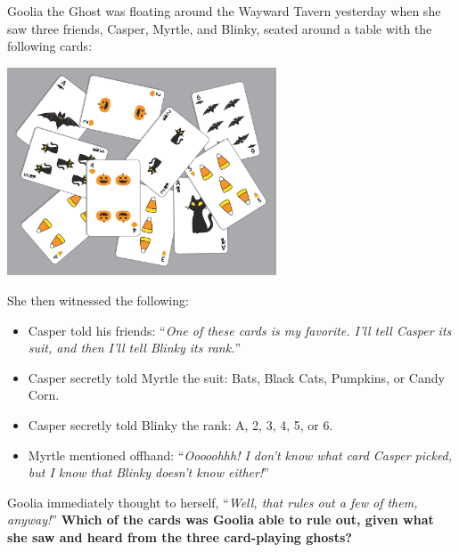 

Goolia the Ghost was floating around the Wayward Tavern yesterday when she
saw three friends, Casper, Myrtle, and Blinky, seated around a table with the
following cards:

\begin{center}
    \includegraphics[width=0.6\textwidth]{assets/kat/cardstogeth}
\end{center}

She then witnessed the following:

\begin{itemize}
  \item Casper told his friends:
        ``\textit{One of these cards is my favorite. I'll tell Casper
        its suit, and then I'll tell Blinky its rank.}''
  \item Casper secretly told Myrtle the suit:
        Bats, Black Cats, Pumpkins, or Candy Corn.
  \item Casper secretly told Blinky the rank:
        A, 2, 3, 4, 5, or 6.
  \item Myrtle mentioned offhand:
        ``\textit{Ooooohhh! I don't know what card Casper picked, but I know
        that Blinky doesn't know either!}''
\end{itemize}

Goolia immediately thought to herself,
``\textit{Well, that rules out a few of them, anyway!}''
\textbf{Which of the cards was Goolia able to rule out, given what
she saw and heard from the three card-playing ghosts?}

%
